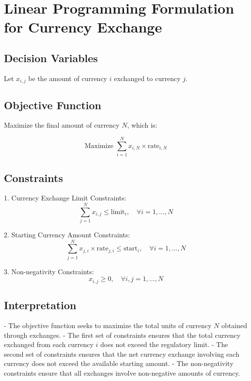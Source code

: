 \documentclass{article}
\begin{document}
\section*{Linear Programming Formulation for Currency Exchange}

\subsection*{Decision Variables}
Let \( x_{i,j} \) be the amount of currency \( i \) exchanged to currency \( j \).

\subsection*{Objective Function}
Maximize the final amount of currency \( N \), which is:

\[
\text{Maximize } \sum_{i=1}^{N} x_{i,N} \times \text{rate}_{i,N}
\]

\subsection*{Constraints}

1. Currency Exchange Limit Constraints:
   \[
   \sum_{j=1}^{N} x_{i,j} \leq \text{limit}_i, \quad \forall i = 1, \ldots, N
   \]

2. Starting Currency Amount Constraints:
   \[
   \sum_{j=1}^{N} x_{j,i} \times \text{rate}_{j,i} \leq \text{start}_i, \quad \forall i = 1, \ldots, N
   \]

3. Non-negativity Constraints:
   \[
   x_{i,j} \geq 0, \quad \forall i, j = 1, \ldots, N
   \]

\subsection*{Interpretation}

- The objective function seeks to maximize the total units of currency \( N \) obtained through exchanges.
- The first set of constraints ensures that the total currency exchanged from each currency \( i \) does not exceed the regulatory limit.
- The second set of constraints ensures that the net currency exchange involving each currency does not exceed the available starting amount.
- The non-negativity constraints ensure that all exchanges involve non-negative amounts of currency.
\end{document}
